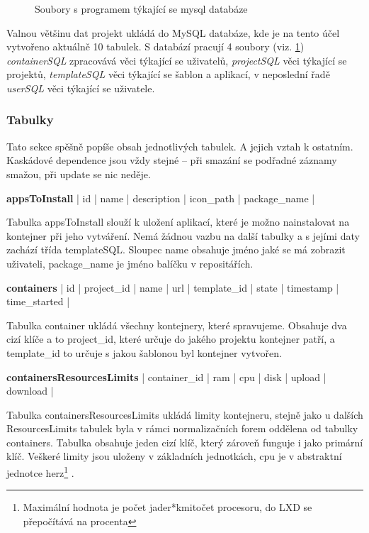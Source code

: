 \documentclass[a4paper,oneside,12pt]{report}
\begin{document}
\begin{figure}[h]
	\caption[Soubory s programem týkající se mysql databáze, vlastni tvorba]{Soubory s programem týkající se mysql databáze}
	\label{fig:sqlClasses}
\end{figure}

Valnou většinu dat projekt ukládá do MySQL databáze, kde je na tento účel vytvořeno aktuálně 10 tabulek.
S databází pracují 4 soubory (viz. \ref{fig:sqlClasses}) \textit{containerSQL} zpracovává věci týkající se uživatelů, \textit{projectSQL} věci týkající se projektů, \textit{templateSQL} věci týkající se šablon a aplikací, v neposlední řadě \textit{userSQL} věci týkající se uživatele.

\subsubsection{Tabulky}

Tato sekce spěšně popíše obsah jednotlivých tabulek. A jejich vztah k ostatním. Kaskádové dependence jsou vždy stejné -- při smazání se podřadné záznamy smažou, při update se nic neděje.

\vspace{0.3cm}
\noindent
\textbf{appsToInstall} | id | name | description | icon\_path | package\_name |

Tabulka appsToInstall slouží k uložení aplikací, které je možno nainstalovat na kontejner při jeho vytváření.
Nemá žádnou vazbu na další tabulky a s jejími daty zachází třída templateSQL.
Sloupec name obsahuje jméno jaké se má zobrazit uživateli, package\_name je jméno balíčku v repositářích.

\vspace{0.3cm}
\noindent
\textbf{containers} | id | project\_id | name | url | template\_id | state | timestamp \linebreak[4] | time\_started |

Tabulka container ukládá všechny kontejnery, které spravujeme.
Obsahuje dva cizí klíče a to project\_id, které určuje do jakého projektu kontejner patří, a template\_id to určuje s jakou šablonou byl kontejner vytvořen.


\vspace{0.3cm}
\noindent
\textbf{containersResourcesLimits} | container\_id | ram | cpu | disk | upload | download |

Tabulka containersResourcesLimits ukládá limity kontejneru, stejně jako u dalších ResourcesLimits tabulek byla v rámci normalizačních forem oddělena od tabulky containers.
Tabulka obsahuje jeden cizí klíč, který zároveň funguje i jako primární klíč.
Veškeré limity jsou uloženy v základních jednotkách, cpu je v abstraktní jednotce herz\footnote{Maximální hodnota je počet jader*kmitočet procesoru, do LXD se přepočítává na procenta} .
\end{document}
